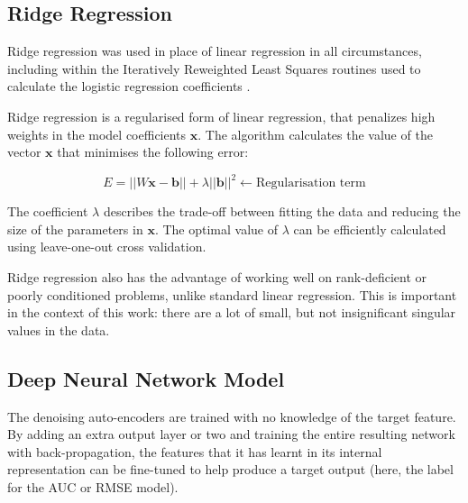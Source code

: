 \documentclass{article}
\begin{document}
\subsection{Ridge Regression}

Ridge regression was used in place of linear regression in all circumstances, including within the Iteratively Reweighted Least Squares routines used to calculate the logistic regression coefficients \cite{komarek2005}.

Ridge regression is a regularised form of linear regression, that penalizes high weights in the model coefficients $\mathbf{x}$.  The algorithm calculates the value of the vector $\mathbf{x}$ that minimises the following error:

\begin{equation}
  E = ||W\mathbf{x} - \mathbf{b}|| + \lambda ||\mathbf{b}||^2 \leftarrow \mbox{Regularisation term}
\end{equation}

The coefficient $\lambda$ describes the trade-off between fitting the data and reducing the size of the parameters in $\mathbf{x}$.  The optimal value of $\lambda$ can be efficiently calculated using leave-one-out cross validation.

Ridge regression also has the advantage of working well on rank-deficient or poorly conditioned problems, unlike standard linear regression.  
This is important in the context of this work: there are a lot of small, but not insignificant singular values in the data. 

\subsection{Deep Neural Network Model}

The denoising auto-encoders are trained with no knowledge of the target feature.
By adding an extra output layer or two and training the entire resulting network with back-propagation, the features that it has learnt in its internal representation can be fine-tuned to help produce a target output (here, the label for the AUC or RMSE model).
\end{document}
